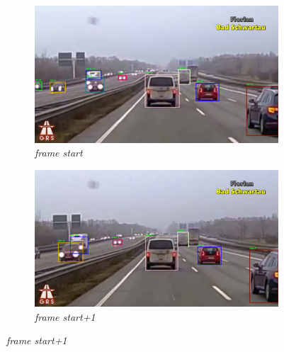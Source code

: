 \documentclass[11pt,a4paper]{article}
\begin{document}
\begin{figure}[!h]
\centering
\begin{subfigure}[b]{0.48\textwidth}
\includegraphics[width=\textwidth]{1}
\caption{\textit{frame start}}
\end{subfigure}
\label{fig:start_0}
\hfill
\begin{subfigure}[b]{0.48\textwidth}
\includegraphics[width=\textwidth]{2}
\caption{\textit{frame start+1}}
\end{subfigure}
\label{fig:start_1}



\end{figure}
\end{document}
